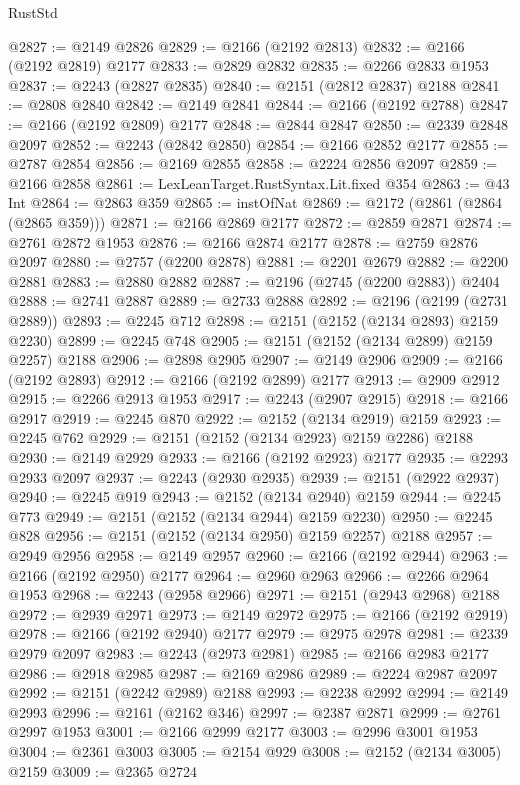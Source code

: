 \begin{lexlean}{RustStd}
\begin{coremodule}
@2827 := @2149 @2826
@2829 := @2166 (@2192 @2813)
@2832 := @2166 (@2192 @2819) @2177
@2833 := @2829 @2832
@2835 := @2266 @2833 @1953
@2837 := @2243 (@2827 @2835)
@2840 := @2151 (@2812 @2837) @2188
@2841 := @2808 @2840
@2842 := @2149 @2841
@2844 := @2166 (@2192 @2788)
@2847 := @2166 (@2192 @2809) @2177
@2848 := @2844 @2847
@2850 := @2339 @2848 @2097
@2852 := @2243 (@2842 @2850)
@2854 := @2166 @2852 @2177
@2855 := @2787 @2854
@2856 := @2169 @2855
@2858 := @2224 @2856 @2097
@2859 := @2166 @2858
@2861 := LexLeanTarget.RustSyntax.Lit.fixed @354
@2863 := @43 Int
@2864 := @2863 @359
@2865 := instOfNat
@2869 := @2172 (@2861 (@2864 (@2865 @359)))
@2871 := @2166 @2869 @2177
@2872 := @2859 @2871
@2874 := @2761 @2872 @1953
@2876 := @2166 @2874 @2177
@2878 := @2759 @2876 @2097
@2880 := @2757 (@2200 @2878)
@2881 := @2201 @2679
@2882 := @2200 @2881
@2883 := @2880 @2882
@2887 := @2196 (@2745 (@2200 @2883)) @2404
@2888 := @2741 @2887
@2889 := @2733 @2888
@2892 := @2196 (@2199 (@2731 @2889))
@2893 := @2245 @712
@2898 := @2151 (@2152 (@2134 @2893) @2159 @2230)
@2899 := @2245 @748
@2905 := @2151 (@2152 (@2134 @2899) @2159 @2257) @2188
@2906 := @2898 @2905
@2907 := @2149 @2906
@2909 := @2166 (@2192 @2893)
@2912 := @2166 (@2192 @2899) @2177
@2913 := @2909 @2912
@2915 := @2266 @2913 @1953
@2917 := @2243 (@2907 @2915)
@2918 := @2166 @2917
@2919 := @2245 @870
@2922 := @2152 (@2134 @2919) @2159
@2923 := @2245 @762
@2929 := @2151 (@2152 (@2134 @2923) @2159 @2286) @2188
@2930 := @2149 @2929
@2933 := @2166 (@2192 @2923) @2177
@2935 := @2293 @2933 @2097
@2937 := @2243 (@2930 @2935)
@2939 := @2151 (@2922 @2937)
@2940 := @2245 @919
@2943 := @2152 (@2134 @2940) @2159
@2944 := @2245 @773
@2949 := @2151 (@2152 (@2134 @2944) @2159 @2230)
@2950 := @2245 @828
@2956 := @2151 (@2152 (@2134 @2950) @2159 @2257) @2188
@2957 := @2949 @2956
@2958 := @2149 @2957
@2960 := @2166 (@2192 @2944)
@2963 := @2166 (@2192 @2950) @2177
@2964 := @2960 @2963
@2966 := @2266 @2964 @1953
@2968 := @2243 (@2958 @2966)
@2971 := @2151 (@2943 @2968) @2188
@2972 := @2939 @2971
@2973 := @2149 @2972
@2975 := @2166 (@2192 @2919)
@2978 := @2166 (@2192 @2940) @2177
@2979 := @2975 @2978
@2981 := @2339 @2979 @2097
@2983 := @2243 (@2973 @2981)
@2985 := @2166 @2983 @2177
@2986 := @2918 @2985
@2987 := @2169 @2986
@2989 := @2224 @2987 @2097
@2992 := @2151 (@2242 @2989) @2188
@2993 := @2238 @2992
@2994 := @2149 @2993
@2996 := @2161 (@2162 @346)
@2997 := @2387 @2871
@2999 := @2761 @2997 @1953
@3001 := @2166 @2999 @2177
@3003 := @2996 @3001 @1953
@3004 := @2361 @3003
@3005 := @2154 @929
@3008 := @2152 (@2134 @3005) @2159
@3009 := @2365 @2724

\end{coremodule}
\end{lexlean}
